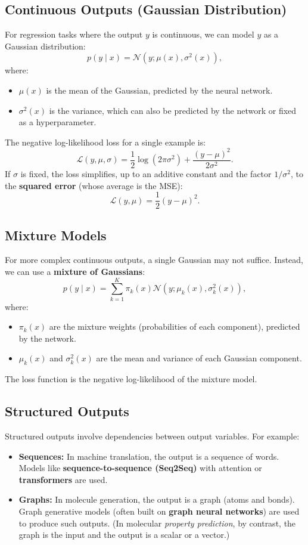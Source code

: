 \begin{notechapter}
\subsection{Continuous Outputs (Gaussian Distribution)}
For regression tasks where the output \( y \) is continuous, we can model \( y \) as a Gaussian distribution:
\[
p(y \mid x) = \mathcal{N}(y; \mu(x), \sigma^2(x)),
\]
where:
\begin{itemize}
    \item \( \mu(x) \) is the mean of the Gaussian, predicted by the neural network.
    \item \( \sigma^2(x) \) is the variance, which can also be predicted by the network or fixed as a hyperparameter.
\end{itemize}

The negative log-likelihood loss for a single example is:
\[
\mathcal{L}(y, \mu, \sigma) = \frac{1}{2} \log(2\pi\sigma^2) + \frac{(y - \mu)^2}{2\sigma^2}.
\]
If \( \sigma \) is fixed, the loss simplifies, up to an additive constant and the factor \( 1/\sigma^2 \), to the \textbf{squared error} (whose average is the MSE):
\[
\mathcal{L}(y, \mu) = \frac{1}{2} (y - \mu)^2.
\]

\subsection{Mixture Models}
For more complex continuous outputs, a single Gaussian may not suffice. Instead, we can use a \textbf{mixture of Gaussians}:
\[
p(y \mid x) = \sum_{k=1}^K \pi_k(x) \mathcal{N}(y; \mu_k(x), \sigma_k^2(x)),
\]
where:
\begin{itemize}
    \item \( \pi_k(x) \) are the mixture weights (probabilities of each component), predicted by the network.
    \item \( \mu_k(x) \) and \( \sigma_k^2(x) \) are the mean and variance of each Gaussian component.
\end{itemize}

The loss function is the negative log-likelihood of the mixture model.

\subsection{Structured Outputs}
Structured outputs involve dependencies between output variables. For example:
\begin{itemize}
    \item \textbf{Sequences:} In machine translation, the output is a sequence of words. Models like \textbf{sequence-to-sequence (Seq2Seq)} with attention or \textbf{transformers} are used.
        \item \textbf{Graphs:} In molecule generation, the output is a graph (atoms and bonds). Graph generative models (often built on \textbf{graph neural networks}) are used to produce such outputs. (In molecular \emph{property prediction}, by contrast, the graph is the input and the output is a scalar or a vector.)
\end{itemize}


\end{notechapter}
